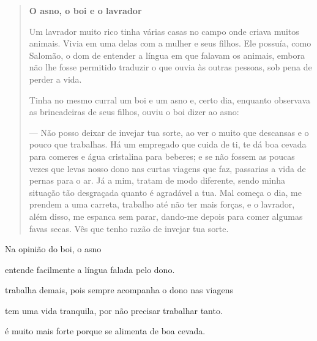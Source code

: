 \begin{quote}
\textbf{O asno, o boi e o lavrador}

Um lavrador muito rico tinha várias casas no campo onde criava muitos
animais. Vivia em uma delas com a mulher e seus filhos. Ele possuía,
como Salomão, o dom de entender a língua em que falavam os animais,
embora não lhe fosse permitido traduzir o que ouvia às outras pessoas,
sob pena de perder a vida.

Tinha no mesmo curral um boi e um asno e, certo dia, enquanto observava
as brincadeiras de seus filhos, ouviu o boi dizer ao asno:

--- Não posso deixar de invejar tua sorte, ao ver o muito que descansas e
o pouco que trabalhas. Há um empregado que cuida de ti, te dá boa cevada
para comeres e água cristalina para beberes; e se não fossem as poucas
vezes que levas nosso dono nas curtas viagens que faz, passarias a vida
de pernas para o ar. Já a mim, tratam de modo diferente, sendo minha
situação tão desgraçada quanto é agradável a tua. Mal começa o dia, me
prendem a uma carreta, trabalho até não ter mais forças, e o lavrador,
além disso, me espanca sem parar, dando-me depois para comer algumas
favas secas. Vês que tenho razão de invejar tua sorte.

\end{quote}

Na opinião do boi, o asno

\begin{escolha}
\item entende facilmente a língua falada pelo dono.

\item trabalha demais, pois sempre acompanha o dono nas viagens

\item tem uma vida tranquila, por não precisar trabalhar tanto.

\item é muito mais forte porque se alimenta de boa cevada.
\end{escolha}


